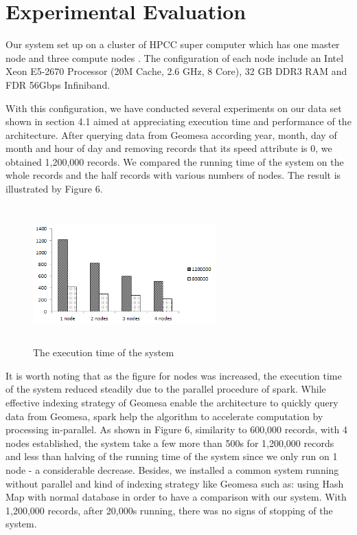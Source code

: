 \documentclass{acm_proc_article-sp}
\begin{document}
\section{Experimental Evaluation}
	Our system set up on a cluster of HPCC super computer which has one master node and three compute nodes . The configuration of each node include an Intel Xeon E5-2670 Processor (20M Cache, 2.6 GHz, 8 Core), 32 GB DDR3 RAM and FDR 56Gbps Infiniband.
	
	With this configuration, we have conducted several experiments on our data set shown in section 4.1 aimed at appreciating execution time and performance of the architecture. After querying data from Geomesa according year, month, day of month and hour of day and removing records that its speed attribute is 0, we obtained 1,200,000 records. We compared the running time of the system on the whole records and the half records with various numbers of nodes. The result is illustrated by Figure 6.
	
	
	\begin{figure}
		\centering
		\includegraphics[height=150pt,width=200pt]{figure6}
		\caption{The execution time of the system}
	\end{figure}

\setlength{\parindent}{0.7cm} It is worth noting that as the figure for nodes was increased, the execution time of the system reduced steadily due to the parallel procedure of spark. While effective indexing strategy of Geomesa enable the architecture to quickly query data from Geomesa, spark help the algorithm to accelerate computation by processing in-parallel. As shown in Figure 6, similarity to 600,000 records, with 4 nodes established, the system take a few more than 500s for 1,200,000 records and less than halving of the running time of the system since we only run on 1 node - a considerable decrease. Besides, we installed a common system running without parallel and kind of indexing strategy like Geomesa such as: using Hash Map with normal database in order to have a comparison with our system. With 1,200,000 records, after 20,000s running, there was no signs of stopping of the system.
	
\end{document}
